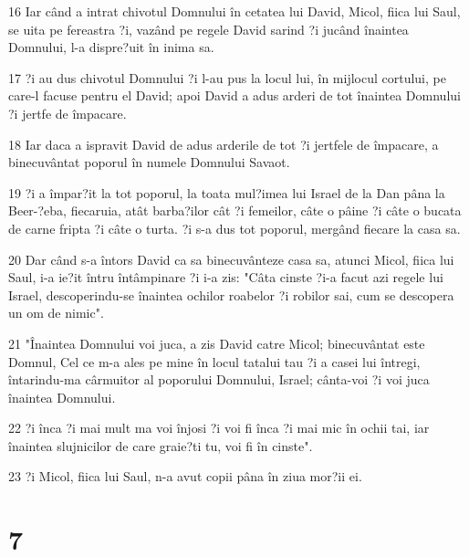 \par 16 Iar când a intrat chivotul Domnului în cetatea lui David, Micol, fiica lui Saul, se uita pe fereastra ?i, vazând pe regele David sarind ?i jucând înaintea Domnului, l-a dispre?uit în inima sa.
\par 17 ?i au dus chivotul Domnului ?i l-au pus la locul lui, în mijlocul cortului, pe care-l facuse pentru el David; apoi David a adus arderi de tot înaintea Domnului ?i jertfe de împacare.
\par 18 Iar daca a ispravit David de adus arderile de tot ?i jertfele de împacare, a binecuvântat poporul în numele Domnului Savaot.
\par 19 ?i a împar?it la tot poporul, la toata mul?imea lui Israel de la Dan pâna la Beer-?eba, fiecaruia, atât barba?ilor cât ?i femeilor, câte o pâine ?i câte o bucata de carne fripta ?i câte o turta. ?i s-a dus tot poporul, mergând fiecare la casa sa.
\par 20 Dar când s-a întors David ca sa binecuvânteze casa sa, atunci Micol, fiica lui Saul, i-a ie?it întru întâmpinare ?i i-a zis: "Câta cinste ?i-a facut azi regele lui Israel, descoperindu-se înaintea ochilor roabelor ?i robilor sai, cum se descopera un om de nimic".
\par 21 "Înaintea Domnului voi juca, a zis David catre Micol; binecuvântat este Domnul, Cel ce m-a ales pe mine în locul tatalui tau ?i a casei lui întregi, întarindu-ma cârmuitor al poporului Domnului, Israel; cânta-voi ?i voi juca înaintea Domnului.
\par 22 ?i înca ?i mai mult ma voi înjosi ?i voi fi înca ?i mai mic în ochii tai, iar înaintea slujnicilor de care graie?ti tu, voi fi în cinste".
\par 23 ?i Micol, fiica lui Saul, n-a avut copii pâna în ziua mor?ii ei.

\chapter{7}

